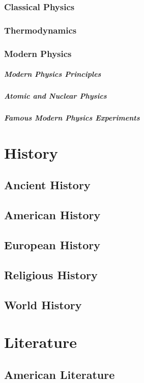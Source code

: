 \documentclass[12pt]{book}
\begin{document}
		\subsection{Classical Physics}
		\subsection{Thermodynamics}
		\subsection{Modern Physics}
			\paragraph{Modern Physics Principles}
			\paragraph{Atomic and Nuclear Physics}
			\paragraph{Famous Modern Physics Experiments}
			
		


\chapter{History}
	\section{Ancient History}
	\section{American History}
	\section{European History}
	\section{Religious History}
	\section{World History}
\chapter{Literature}
	\section{American Literature}
\end{document}
